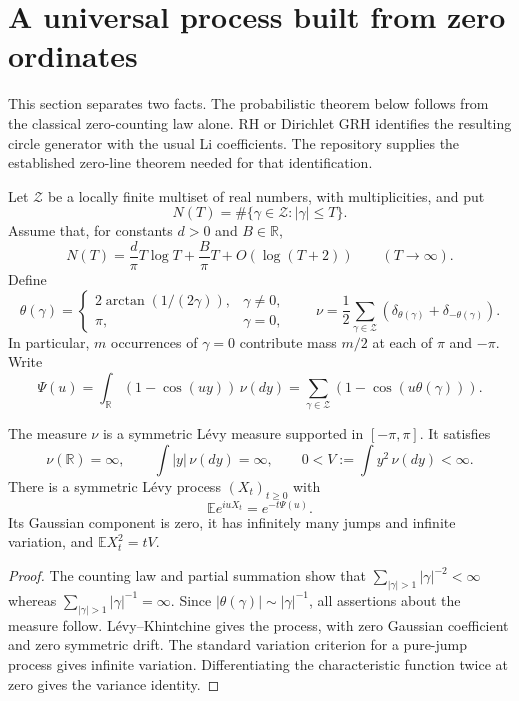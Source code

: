 
\section{A universal process built from zero ordinates}

This section separates two facts. The probabilistic theorem below follows
from the classical zero-counting law alone. RH or Dirichlet GRH identifies
the resulting circle generator with the usual Li coefficients. The repository supplies the established zero-line theorem needed for
that identification.

Let $\mathcal Z$ be a locally finite multiset of real numbers, with
multiplicities, and put
\[
 N(T)=\#\{\gamma\in\mathcal Z:|\gamma|\leq T\}.
\]
Assume that, for constants $d>0$ and $B\in\mathbb R$,
\begin{equation}\label{eq:generic-zero-count}
 N(T)=\frac{d}{\pi}T\log T+\frac{B}{\pi}T+O(\log(T+2))
 \qquad(T\longrightarrow\infty).
\end{equation}
Define
\[
 \theta(\gamma)=
 \begin{cases}2\arctan(1/(2\gamma)),&\gamma\ne0,\\
 \pi,&\gamma=0,
 \end{cases}
 \qquad
 \nu=\frac12\sum_{\gamma\in\mathcal Z}
       (\delta_{\theta(\gamma)}+\delta_{-\theta(\gamma)}).
\]
In particular, $m$ occurrences of $\gamma=0$ contribute mass $m/2$ at
each of $\pi$ and $-\pi$. Write
\begin{equation}\label{eq:jump-symbol}
 \Psi(u)=\int_{\mathbb R}(1-\cos(uy))\,\nu(dy)
       =\sum_{\gamma\in\mathcal Z}(1-\cos(u\theta(\gamma))).
\end{equation}

\begin{lemma}\label{lem:jump-exists}
The measure $\nu$ is a symmetric L\'evy measure supported in $[-\pi,\pi]$.
It satisfies
\[
 \nu(\mathbb R)=\infty,\qquad
 \int |y|\,\nu(dy)=\infty,\qquad
 0<V:=\int y^2\,\nu(dy)<\infty.
\]
There is a symmetric L\'evy process $(X_t)_{t\geq0}$ with
\[
 \mathbb E e^{iuX_t}=e^{-t\Psi(u)}.
\]
Its Gaussian component is zero, it has infinitely many jumps and infinite
variation, and $\mathbb E X_t^2=tV$.
\end{lemma}

\begin{proof}
The counting law and partial summation show that
$\sum_{|\gamma|>1}|\gamma|^{-2}<\infty$ whereas
$\sum_{|\gamma|>1}|\gamma|^{-1}=\infty$.
Since $|\theta(\gamma)|\sim |\gamma|^{-1}$, all assertions about the
measure follow. L\'evy--Khintchine gives the process, with zero Gaussian
coefficient and zero symmetric drift. The standard variation criterion
for a pure-jump process gives infinite variation. Differentiating the
characteristic function twice at zero gives the variance identity.
\end{proof}

